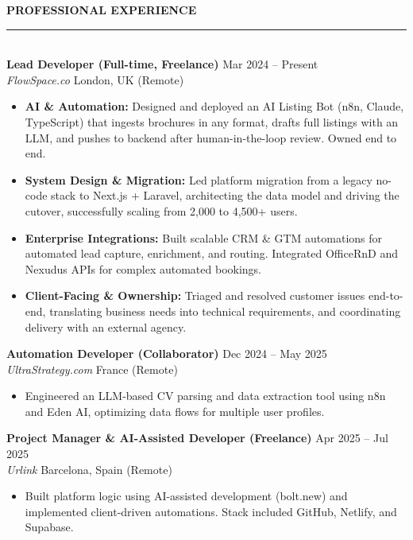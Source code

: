 \documentclass[10pt, a4paper]{article}
\begin{document}
\vspace{0.3cm}
\noindent \textbf{PROFESSIONAL EXPERIENCE} \\
\noindent\rule{\textwidth}{0.4pt} \\
\textbf{Lead Developer (Full-time, Freelance)} \hfill Mar 2024 -- Present \\
\textit{FlowSpace.co} \hfill London, UK (Remote)
\begin{itemize}[leftmargin=0.5cm, nosep]
    \item \textbf{AI \& Automation:} Designed and deployed an AI Listing Bot (n8n, Claude, TypeScript) that ingests brochures in any format, drafts full listings with an LLM, and pushes to backend after human-in-the-loop review. Owned end to end.
    \item \textbf{System Design \& Migration:} Led platform migration from a legacy no-code stack to Next.js + Laravel, architecting the data model and driving the cutover, successfully scaling from 2,000 to 4,500+ users.
    \item \textbf{Enterprise Integrations:} Built scalable CRM \& GTM automations for automated lead capture, enrichment, and routing. Integrated OfficeRnD and Nexudus APIs for complex automated bookings.
    \item \textbf{Client-Facing \& Ownership:} Triaged and resolved customer issues end-to-end, translating business needs into technical requirements, and coordinating delivery with an external agency.
\end{itemize}

\vspace{0.2cm}
\textbf{Automation Developer (Collaborator)} \hfill Dec 2024 -- May 2025 \\
\textit{UltraStrategy.com} \hfill France (Remote)
\begin{itemize}[leftmargin=0.5cm, nosep]
    \item Engineered an LLM-based CV parsing and data extraction tool using n8n and Eden AI, optimizing data flows for multiple user profiles.
\end{itemize}

\vspace{0.2cm}
\textbf{Project Manager \& AI-Assisted Developer (Freelance)} \hfill Apr 2025 -- Jul 2025 \\
\textit{Urlink} \hfill Barcelona, Spain (Remote)
\begin{itemize}[leftmargin=0.5cm, nosep]
    \item Built platform logic using AI-assisted development (bolt.new) and implemented client-driven automations. Stack included GitHub, Netlify, and Supabase.
\end{itemize}
\end{document}
